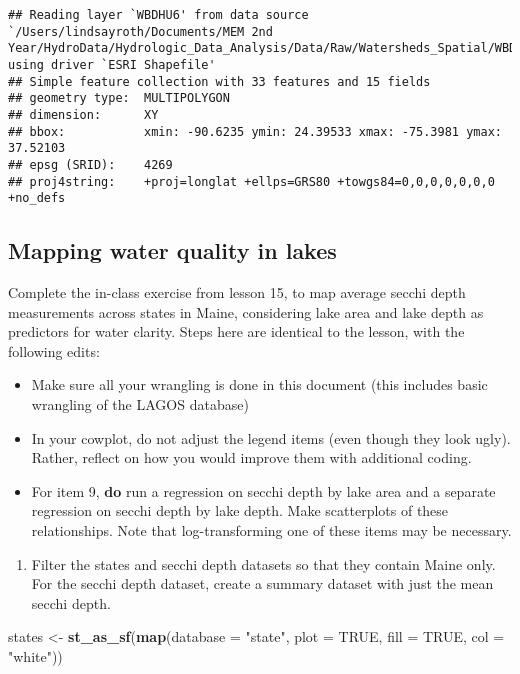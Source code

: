 \documentclass[]{article}
\newenvironment{Shaded}{\begin{snugshade}}{\end{snugshade}}
\newcommand{\DataTypeTok}[1]{\textcolor[rgb]{0.13,0.29,0.53}{#1}}
\newcommand{\KeywordTok}[1]{\textcolor[rgb]{0.13,0.29,0.53}{\textbf{#1}}}
\newcommand{\NormalTok}[1]{#1}
\newcommand{\OtherTok}[1]{\textcolor[rgb]{0.56,0.35,0.01}{#1}}
\newcommand{\StringTok}[1]{\textcolor[rgb]{0.31,0.60,0.02}{#1}}
\providecommand{\tightlist}{%
  \setlength{\itemsep}{0pt}\setlength{\parskip}{0pt}}
\begin{document}
\begin{verbatim}
## Reading layer `WBDHU6' from data source `/Users/lindsayroth/Documents/MEM 2nd Year/HydroData/Hydrologic_Data_Analysis/Data/Raw/Watersheds_Spatial/WBDHU6.dbf' using driver `ESRI Shapefile'
## Simple feature collection with 33 features and 15 fields
## geometry type:  MULTIPOLYGON
## dimension:      XY
## bbox:           xmin: -90.6235 ymin: 24.39533 xmax: -75.3981 ymax: 37.52103
## epsg (SRID):    4269
## proj4string:    +proj=longlat +ellps=GRS80 +towgs84=0,0,0,0,0,0,0 +no_defs
\end{verbatim}

\hypertarget{mapping-water-quality-in-lakes}{%
\subsection{Mapping water quality in
lakes}\label{mapping-water-quality-in-lakes}}

Complete the in-class exercise from lesson 15, to map average secchi
depth measurements across states in Maine, considering lake area and
lake depth as predictors for water clarity. Steps here are identical to
the lesson, with the following edits:

\begin{itemize}
\tightlist
\item
  Make sure all your wrangling is done in this document (this includes
  basic wrangling of the LAGOS database)
\item
  In your cowplot, do not adjust the legend items (even though they look
  ugly). Rather, reflect on how you would improve them with additional
  coding.
\item
  For item 9, \textbf{do} run a regression on secchi depth by lake area
  and a separate regression on secchi depth by lake depth. Make
  scatterplots of these relationships. Note that log-transforming one of
  these items may be necessary.
\end{itemize}

\begin{enumerate}
\def\labelenumi{\arabic{enumi}.}
\setcounter{enumi}{4}
\tightlist
\item
  Filter the states and secchi depth datasets so that they contain Maine
  only. For the secchi depth dataset, create a summary dataset with just
  the mean secchi depth.
\end{enumerate}

\begin{Shaded}
\begin{Highlighting}[]
\NormalTok{states <-}\StringTok{ }\KeywordTok{st_as_sf}\NormalTok{(}\KeywordTok{map}\NormalTok{(}\DataTypeTok{database =} \StringTok{"state"}\NormalTok{, }\DataTypeTok{plot =} \OtherTok{TRUE}\NormalTok{, }\DataTypeTok{fill =} \OtherTok{TRUE}\NormalTok{, }\DataTypeTok{col =} \StringTok{"white"}\NormalTok{))}
\end{Highlighting}
\end{Shaded}
\end{document}
